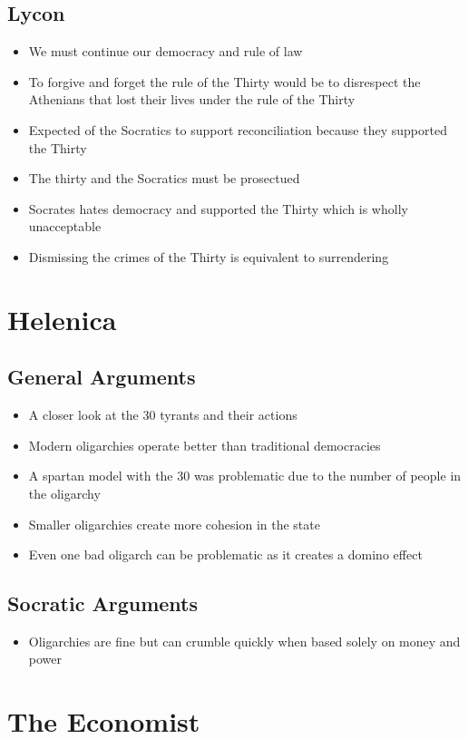 \documentclass[11pt]{article}
\begin{document}
\subsection{Lycon}
\label{sec:orgdd1c0cf}
\begin{itemize}
\item We must continue our democracy and rule of law
\item To forgive and forget the rule of the Thirty would be to disrespect the Athenians that lost
their lives under the rule of the Thirty
\item Expected of the Socratics to support reconciliation because they supported the Thirty
\item The thirty and the Socratics must be prosectued
\item Socrates hates democracy and supported the Thirty which is wholly unacceptable
\item Dismissing the crimes of the Thirty is equivalent to surrendering
\end{itemize}
\section{Helenica}
\label{sec:org8ef2af2}
\subsection{General Arguments}
\label{sec:orgcda6d3b}
\begin{itemize}
\item A closer look at the 30 tyrants and their actions
\item Modern oligarchies operate better than traditional democracies
\item A spartan model with the 30 was problematic due to the number of people in the oligarchy
\item Smaller oligarchies create more cohesion in the state
\item Even one bad oligarch can be problematic as it creates a domino effect
\end{itemize}
\subsection{Socratic Arguments}
\label{sec:org80bbc39}
\begin{itemize}
\item Oligarchies are fine but can crumble quickly when based solely on money and power
\end{itemize}
\section{The Economist}
\label{sec:org19fb9b4}
\end{document}
